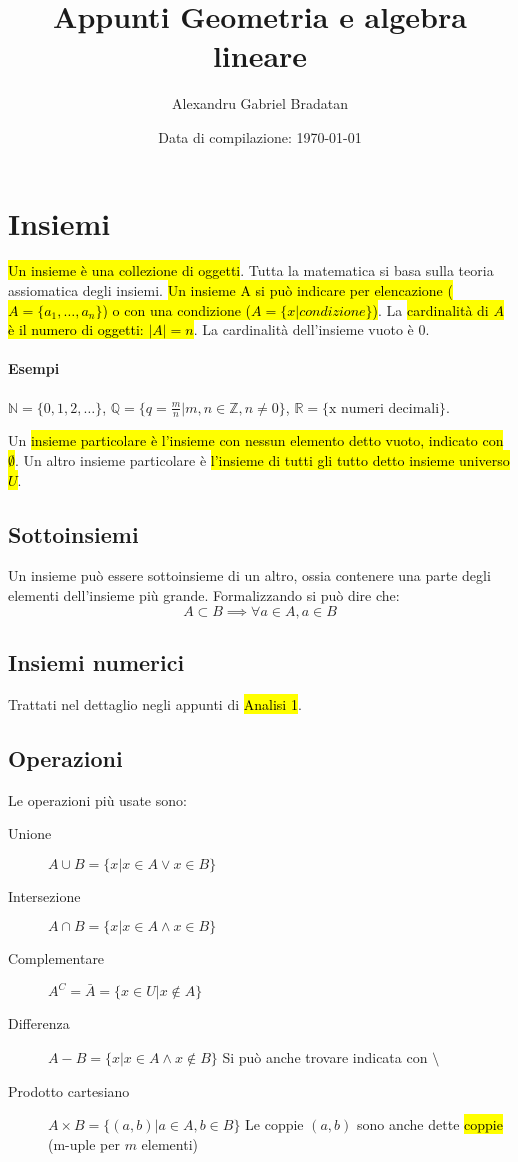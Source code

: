 \documentclass[a4paper,12pt,oneside]{article}
\title{Appunti Geometria e algebra lineare}
\author{Alexandru Gabriel Bradatan}
\date{Data di compilazione: \today}
\begin{document}
\maketitle

\section{Insiemi}
\hl{Un insieme è una collezione di oggetti}. Tutta la matematica si basa
sulla teoria assiomatica degli insiemi. \hl{Un insieme A si può indicare
per elencazione ($A = \{a_1, \dots, a_n\}$) o con una condizione
($A = \{x|\textit{condizione}\}$)}. La \hl{cardinalità di $A$ è il numero di
oggetti: $|A| = n$}. La cardinalità dell'insieme vuoto è 0.

\paragraph{Esempi} $\mathbb{N} = \{0, 1, 2,\dots\}$,
$\mathbb{Q} = \{q = \frac{m}{n} | m,n \in \mathbb{Z}, n \neq 0\}$,
$\mathbb{R} = \{\text{x numeri decimali}\}$.

Un \hl{insieme particolare è l'insieme con nessun elemento detto vuoto, indicato
con $\emptyset$}. Un altro insieme particolare è \hl{l'insieme di tutti gli tutto
detto insieme universo $U$}.

\subsection{Sottoinsiemi}
Un insieme può essere sottoinsieme di un altro, ossia contenere una parte degli
elementi dell'insieme più grande. Formalizzando si può dire che:
\[
    A \subset B \implies \forall a \in A, a \in B
\]

\subsection{Insiemi numerici}
Trattati nel dettaglio negli appunti di \hl{Analisi 1}.

\subsection{Operazioni}
Le operazioni più usate sono:
\begin{description}
    \item[Unione] $A \cup B = \{x | x \in A \vee x \in B\}$
    \item[Intersezione] $A \cap B = \{x | x \in A \wedge x \in B\}$
    \item[Complementare] $A^C = \bar{A} = \{x \in U | x \notin A\}$
    \item[Differenza] $A - B = \{x | x \in A \wedge x \notin B\}$
        Si può anche trovare indicata con $ \setminus $
    \item[Prodotto cartesiano] $A \times B = \{(a,b) | a \in A, b \in B \}$
        Le coppie $(a,b)$ sono anche dette \hl{coppie} (m-uple per $m$ elementi)
\end{description}
\end{document}
